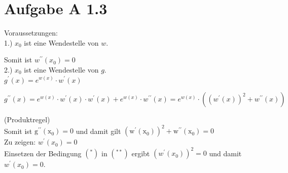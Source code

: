 \documentclass[10pt]{article}
\begin{document}
\section*{Aufgabe A 1.3}
Voraussetzungen:\\
1.) $x_{0}$ ist eine Wendestelle von $w$.

Somit ist $w^{\prime \prime}\left(x_{0}\right)=0$\\
2.) $x_{0}$ ist eine Wendestelle von $g$.\\
$g^{\prime}(x)=e^{w(x)} \cdot w^{\prime}(x)$


\begin{equation*}
g^{\prime \prime}(x)=e^{w(x)} \cdot w^{\prime}(x) \cdot w^{\prime}(x)+e^{w(x)} \cdot w^{\prime \prime}(x)=e^{w(x)} \cdot\left(\left(w^{\prime}(x)\right)^{2}+w^{\prime \prime}(x)\right) \tag{**}
\end{equation*}


(Produktregel)\\
Somit ist $\mathrm{g}^{\prime \prime}\left(\mathrm{x}_{0}\right)=0$ und damit gilt $\left(\mathrm{w}^{\prime}\left(\mathrm{x}_{0}\right)\right)^{2}+\mathrm{w}^{\prime \prime}\left(\mathrm{x}_{0}\right)=0$\\
Zu zeigen: $w^{\prime}\left(x_{0}\right)=0$\\
Einsetzen der Bedingung $\left(^{*}\right)$ in $\left(^{* *}\right)$ ergibt $\left(w^{\prime}\left(x_{0}\right)\right)^{2}=0$ und damit $w^{\prime}\left(x_{0}\right)=0$.
\end{document}
